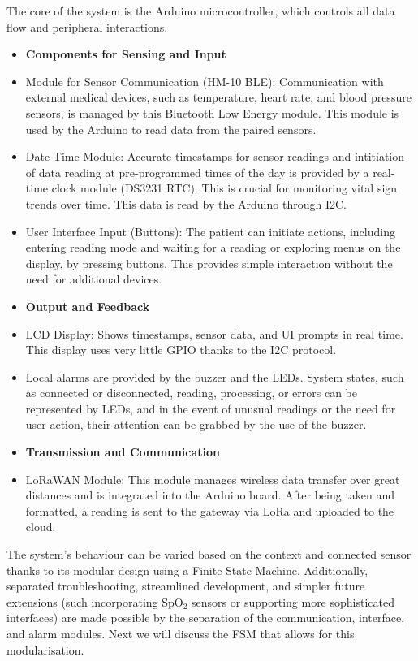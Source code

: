 The core of the system is the Arduino microcontroller, which controls all data flow and peripheral interactions.

\begin{itemize}
	\item[] \textbf{Components for Sensing and Input}
	\item Module for Sensor Communication (HM-10 BLE): Communication with external medical devices, such as temperature, heart rate, and blood pressure sensors, is managed by this Bluetooth Low Energy module. This module is used by the Arduino to read data from the paired sensors.
	\item Date-Time Module: Accurate timestamps for sensor readings and intitiation of data reading at pre-programmed times of the day is provided by a real-time clock module (DS3231 RTC). This is crucial for monitoring vital sign trends over time. This data is read by the Arduino through I2C.
	\item User Interface Input (Buttons): The patient can initiate actions, including entering reading mode and waiting for a reading or exploring menus on the display, by pressing buttons. This provides simple interaction without the need for additional devices.
	\item[] \textbf{Output and Feedback} 
	\item LCD Display: Shows timestamps, sensor data, and UI prompts in real time. This display uses very little GPIO thanks to the I2C protocol.
	\item Local alarms are provided by the buzzer and the LEDs. System states, such as connected or disconnected, reading, processing, or errors can be represented by LEDs, and in the event of unusual readings or the need for user action, their attention can be grabbed by the use of the buzzer.
	\item[] \textbf{Transmission and Communication}
	\item LoRaWAN Module: This module manages wireless data transfer over great distances and is integrated into the Arduino board. After being taken and formatted, a reading is sent to the gateway via LoRa and uploaded to the cloud.
\end{itemize}

The system's behaviour can be varied based on the context and connected sensor thanks to its modular design using a Finite State Machine. Additionally, separated troubleshooting, streamlined development, and simpler future extensions (such incorporating SpO$_2$ sensors or supporting more sophisticated interfaces) are made possible by the separation of the communication, interface, and alarm modules. Next we will discuss the FSM that allows for this modularisation.

